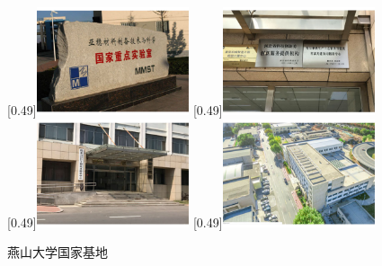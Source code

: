 \documentclass[master,academic]{ysuthesis} %
\begin{document}
			\begin{figure}[!ht]
				\centering
				[0.49\textwidth]{\includegraphics[width=0.4\textwidth]{亚稳材料制备技术与科学国家重点实验室.pdf}}
				[0.49\textwidth]{\includegraphics[width=0.4\textwidth]{精品钢铁生产工艺装备智能化省部共建协同创新中心.pdf}}
				[0.49\textwidth]{\includegraphics[width=0.4\textwidth]{国家创新人才培养示范基地.pdf}}
				[0.49\textwidth]{\includegraphics[width=0.4\textwidth]{国家冷轧板带装备及工艺工程技术研究中心.pdf}}
				\caption{燕山大学国家基地}
				\label{fig_ysunationalbase}
			\end{figure}
			
\end{document}
